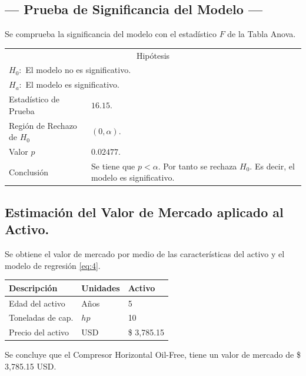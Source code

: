 \subsection{\centering --- Prueba de Significancia del Modelo ---} %
Se comprueba la significancia del modelo con el estadístico \(F\) de la Tabla Anova.
\begin{center}
  \begin{tabular}{|l|p{6cm}|}
    \cline{1-2}
    \multicolumn{2}{|c|}{Hipótesis}\\ \cline{1-2}
    \multicolumn{2}{|l|}{\(H_0:\) El modelo no es significativo.} \\ 
    \multicolumn{2}{|l|}{\(H_a:\) El modelo es significativo.} \\ \cline{1-2}
    Estadístico de Prueba & \(16.15\).\\ \cline{1-2} 
		Región de Rechazo de \(H_0\) & \((0, \alpha )\).\\ \cline{1-2} 
    Valor \(p\) & \(0.02477\).\\ \cline{1-2} 
    Conclusión & Se tiene que \(p<\alpha\). \newline 
		Por tanto se rechaza \(H_0\). \newline 
		Es decir, el modelo es significativo.\\ \cline{1-2} 
  \end{tabular}
\end{center} 

\subsection{\centering Estimación del Valor de Mercado aplicado al Activo.} %
Se obtiene el valor de mercado por medio de las características del activo y el modelo de regresión \eqref{eq:4}.
\begin{center}
  \begin{tabular}{|l|l|l|}
    \hline 
		Descripción   & Unidades  & Activo \\ \hline 
    Edad del activo    & Años      & 5      \\ \hline 
		Toneladas de cap.  & \(hp\) & 10   \\ \hline 
		Precio del activo   & USD       & \$ 3,785.15     \\ \hline 
  \end{tabular}
\end{center} 
Se concluye que el Compresor Horizontal Oil-Free, tiene un valor de mercado de 
\$ 3,785.15  USD.

